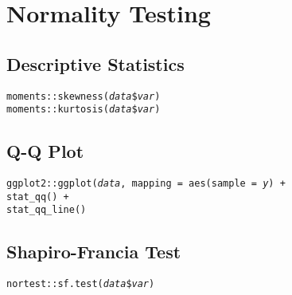 \documentclass{tufte-handout}
\newenvironment{subs}
  {\adjustwidth{3em}{0pt}}
  {\endadjustwidth}
\begin{document}
\vspace{5mm}
\section{Normality Testing}
\begin{subs}

\subsection{Descriptive Statistics}
\noindent \texttt{moments::}{\color{red}\texttt{skewness}}\texttt{(\textit{data}\$\textit{var})}\\
\noindent \texttt{moments::}{\color{red}\texttt{kurtosis}}\texttt{(\textit{data}\$\textit{var})}\\

\vspace{3mm}
\subsection{Q-Q Plot}
\noindent \texttt{ggplot2::}{\color{red}\texttt{ggplot}}\texttt{(\textit{data}, mapping = aes(sample = \textit{y}) +}
\\ \texttt{stat\_qq() +}
\\ \texttt{stat\_qq\_line()}

\vspace{3mm}
\subsection{Shapiro-Francia Test}
\noindent \texttt{nortest::}{\color{red}\texttt{sf.test}}\texttt{(\textit{data}\$\textit{var})}\\

\end{subs}

\end{document}
